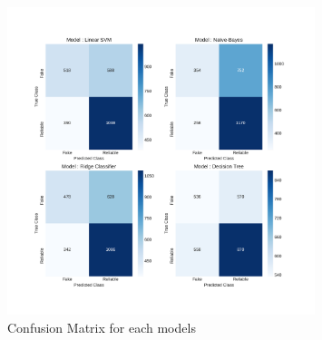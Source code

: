\begin{figure}
	\centering
	\includegraphics[width=0.8\textwidth]{images/chapitre3/test_liar_confMat}
	\caption{Confusion Matrix for each models}
	\label{fig:chap3:confMat1}
\end{figure}

